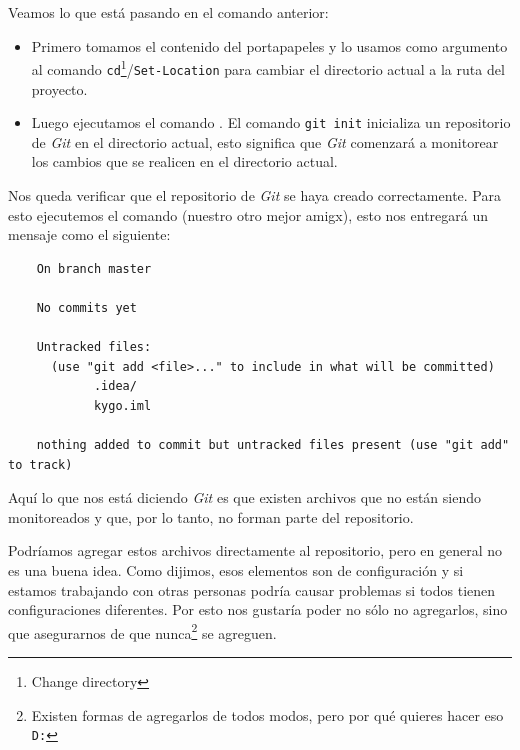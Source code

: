  \begin{defaultbox}[MacOS]
  \end{defaultbox}

  Veamos lo que está pasando en el comando anterior:
  \begin{itemize}
    \item Primero tomamos el contenido del portapapeles y lo usamos como argumento al comando 
      \texttt{cd}\footnote{Change directory}\autocite{CdManPage}/\texttt{Set-Location}\autocite{sdwheelerSetLocationMicrosoftPowerShell} 
      para cambiar el directorio actual a la ruta del proyecto.
    \item Luego ejecutamos el comando .
      El comando \texttt{git init} inicializa un repositorio de \textit{Git} en el directorio
      actual, esto significa que \textit{Git} comenzará a monitorear los cambios que se realicen
      en el directorio actual.
  \end{itemize}

  Nos queda verificar que el repositorio de \textit{Git} se haya creado correctamente.
  Para esto ejecutemos el comando  (nuestro otro mejor amigx), esto nos entregará
  un mensaje como el siguiente:

  \begin{verbatim}
    On branch master

    No commits yet

    Untracked files:
      (use "git add <file>..." to include in what will be committed)
            .idea/
            kygo.iml

    nothing added to commit but untracked files present (use "git add" to track)
  \end{verbatim}

  Aquí lo que nos está diciendo \textit{Git} es que existen archivos que no están siendo 
  monitoreados y que, por lo tanto, no forman parte del repositorio.

  Podríamos agregar estos archivos directamente al repositorio, pero en general no es una buena 
  idea.
  Como dijimos, esos elementos son de configuración y si estamos trabajando con otras personas
  podría causar problemas si todos tienen configuraciones diferentes.
  Por esto nos gustaría poder no sólo no agregarlos, sino que asegurarnos de que nunca\footnote{
    Existen formas de agregarlos de todos modos, pero por qué quieres hacer eso \texttt{D:}
  } se agreguen.


